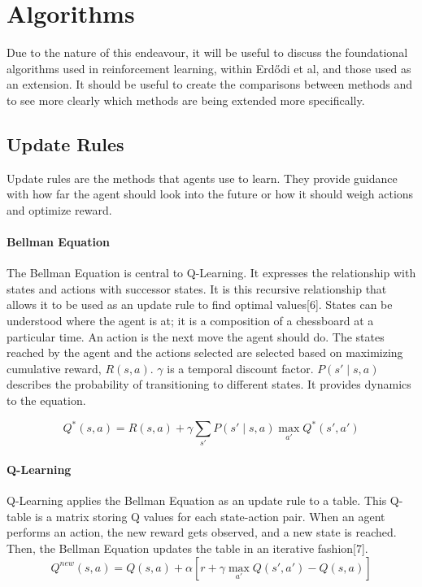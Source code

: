 \documentclass[conference]{IEEEtran}
\begin{document}
\section{Algorithms}
\vspace{-3mm}
Due to the nature of this endeavour, it will be useful to discuss the foundational algorithms used in reinforcement learning, within Erdődi et al, and those used as an extension. It should be useful to create the comparisons between methods and to see more clearly which methods are being extended more specifically. 

\subsection{Update Rules}
Update rules are the methods that agents use to learn. They provide guidance with how far the agent should look into the future or how it should weigh actions and optimize reward. 

\vspace{2mm}
\paragraph{Bellman Equation}
The Bellman Equation is central to Q-Learning. It expresses the relationship with states and actions with successor states. It is this recursive relationship that allows it to be used as an update rule to find optimal values[6]. States can be understood where the agent is at; it is a composition of a chessboard at a particular time. An action is the next move the agent should do. The states reached by the agent and the actions selected are selected based on maximizing cumulative reward, $R(s,a)$. $\gamma$ is a temporal discount factor.  $P(s' \mid s, a)$ describes the probability of transitioning to different states. It provides dynamics to the equation.  

\vspace{-4mm}
\begin{equation}
    Q^*(s, a) = R(s, a) + \gamma \sum_{s'} P(s' \mid s, a) \max_{a'} Q^*(s', a') 
\end{equation}

\vspace{-2mm}
\paragraph{Q-Learning}
Q-Learning applies the Bellman Equation as an update rule to a table. This Q-table is a matrix storing Q values for each state-action pair. When an agent performs an action, the new reward gets observed, and a new state is reached. Then, the Bellman Equation updates the table in an iterative fashion[7]. 
\begin{equation}
    Q^{new}(s, a) = Q(s, a) + \alpha \left[ r + \gamma \max_{a'} Q(s', a') - Q(s, a) \right]
\end{equation}
\end{document}
